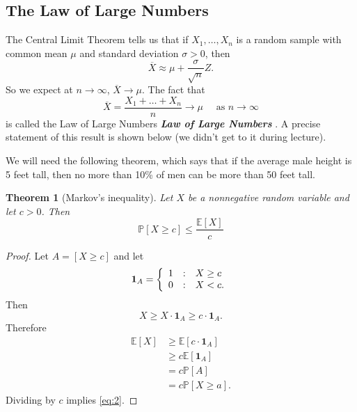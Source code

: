 \documentclass[10pt]{article}
\newtheorem{theorem}{Theorem}
\theoremstyle{definition}
\newcommand{\1}[1]{\textbf{1}_{\left[#1\right]}} %
\def\E{\mathbb{E}} %
\def\P{\mathbb{P}} %
\DeclareRobustCommand{\demph}[1]{%
  \ifmmode
  {\color{Blue}#1}%
  \else
  {\color{Blue}\bfseries\slshape #1}%
  \fi
}
\begin{document}
\subsection{The Law of Large Numbers}
The Central Limit Theorem tells us that if $X_{1},\ldots,X_{n}$ is a random
sample with common mean $\mu$ and standard deviation $\sigma>0$, then
\begin{equation*}
  \overline{X} \approx \mu + \frac{\sigma}{\sqrt{n}}Z.
\end{equation*}
So we expect at $n\to \infty$, $\overline{X}\to \mu$. The fact that
\begin{equation*}
  \overline{X} = \frac{X_{1}+\ldots+X_{n}}{n} \to \mu \quad \text{ as }n \to \infty
\end{equation*}
is called the \demph{Law of Large Numbers}. A precise statement of this result
is shown below (we didn't get to it during lecture).


We will need the following theorem, which says that if the average male height
is 5 feet tall, then no more than 10\% of men can be more than 50 feet tall.

\begin{theorem}[Markov's inequality]
  \label{thm:markovs-inequality}
  Let $X$ be a nonnegative random variable and let $c>0$. Then
  \begin{equation}\label{eq:2}
    \P\left[X \geq c\right] \leq \frac{\E\left[X \right]}{c}
  \end{equation}
\end{theorem}
\begin{proof}
  Let $A= \left[ X \geq c\right]$ and let
  \begin{equation*}
    \boldsymbol{1}_{A} = \left\{ \begin{array}{l@{\quad:\quad}l} 1 & X \geq c\\ 0& X<c.\end{array}\right.
  \end{equation*}
  Then
  \begin{equation*}
    X \geq  X \cdot \boldsymbol{1}_{A} \geq c\cdot \boldsymbol{1}_{A}.
  \end{equation*}
  Therefore
  \begin{align*}
    \E\left[X \right] 
    &\geq \E\left[c \cdot \mathbf{1}_{A}\right]\\
    &\geq c \E\left[\mathbf{1}_{A} \right]\\
    &=c\P\left[A \right]\\
    &=c \P\left[X \geq a\right].
  \end{align*}
  Dividing by $c$ implies \cref{eq:2}.
\end{proof}
\end{document}
